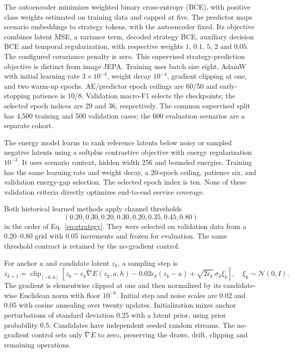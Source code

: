 The autoencoder minimizes weighted binary cross-entropy (BCE), with positive
class weights estimated on training data and capped at five. The predictor
maps scenario embeddings to strategy tokens, with the autoencoder fixed.
Its objective combines latent MSE, a variance term, decoded strategy BCE,
auxiliary decision BCE and temporal regularization, with respective weights
$1$, $0.1$, $5$, $2$ and $0.05$. The configured covariance penalty is zero.
This supervised strategy-prediction objective is distinct from image JEPA.
Training uses batch size eight, AdamW with initial learning rate $3\times10^{-4}$,
weight decay $10^{-4}$, gradient clipping at one, and two warm-up epochs.
AE/predictor epoch ceilings are 60/50 and early-stopping patience is 10/8.
Validation macro-F1 selects the checkpoints; the selected epoch indices are
29 and 36, respectively. The common supervised split has 4,500 training and
500 validation cases; the 600 evaluation scenarios are a separate cohort.

The energy model learns to rank reference latents below noisy or sampled
negative latents using a softplus contrastive objective with energy
regularization $10^{-3}$. It uses scenario context, hidden width 256 and
bounded energies. Training has the same learning rate and weight decay,
a 20-epoch ceiling, patience six, and validation energy-gap selection.
The selected epoch index is ten. None of these validation criteria directly
optimizes end-to-end service coverage.

Both historical learned methods apply channel thresholds
\begin{equation}
 (0.20,0.30,0.20,0.30,0.20,0.35,0.45,0.80)
\end{equation}
in the order of Eq.~\eqref{eq:strategy}. They were selected on validation
data from a 0.20--0.80 grid with 0.05 increments and frozen for evaluation.
The same threshold contract is retained by the no-gradient control.

For anchor $a$ and candidate latent $z_k$, a sampling step is
\begin{equation}
 z_{k+1}=\operatorname{clip}_{[-6,6]}\!\left[
 z_k-\epsilon_k\widetilde\nabla E(z_k,a,h)
 -0.02\epsilon_k(z_k-a)
 +\sqrt{2\epsilon_k}\,\sigma_k\xi_k\right],
 \quad \xi_k\sim\mathcal N(0,I).
\end{equation}
The gradient is elementwise clipped at one and then normalized by its
candidate-wise Euclidean norm with floor $10^{-6}$. Initial step and noise
scales are 0.02 and 0.05 with cosine annealing over twenty updates. Initialization
mixes anchor perturbations of standard deviation 0.25 with a latent prior,
using prior probability 0.5. Candidates have independent seeded random
streams. The no-gradient control sets only $\widetilde\nabla E$ to zero,
preserving the draws, drift, clipping and remaining operations.

